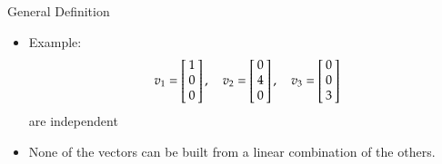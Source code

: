 \documentclass[10pt]{beamer}
\begin{document}
\begin{frame}{General Definition}

\begin{itemize}
    \item Example:
    $$
    v_1=\left[\negthickspace\begin{array}{r}  1 \\ 0 \\  0 \end{array}\negthickspace\right],\quad
    v_2 = \left[\negthickspace\begin{array}{r}  0 \\  4 \\  0 \end{array}\negthickspace\right],\quad
    v_3=\left[\negthickspace\begin{array}{r}  0 \\ 0 \\  3 \end{array}\negthickspace\right]
    $$
    are independent

\item None of the vectors can be built from a linear combination of the others.
\end{itemize}

\end{frame}

\end{document}
